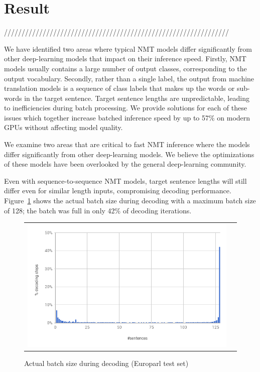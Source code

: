\documentclass[11pt,a4paper]{article}
\begin{document}
\section{Result}
\label{sec:Result}


////////////////////////////////////////////////////////////////


We have identified two areas where typical NMT models differ significantly from other deep-learning models that impact on their inference speed. Firstly, NMT models usually contains a large number of output classes, corresponding to the output vocabulary. Secondly, rather than a single label, the output from machine translation models is a sequence of class labels that makes up the words or sub-words in the target sentence. Target sentence lengths are unpredictable, leading to inefficiencies during batch processing. We provide solutions for each of these issues which together increase batched inference speed by up to 57\% on modern GPUs without affecting model quality.

We examine two areas that are critical to fast NMT inference where the models differ significantly from other deep-learning models. We believe the optimizations of these models have been overlooked by the general deep-learning community.



Even with sequence-to-sequence NMT models, target sentence lengths will still differ even for similar length inputs, compromising decoding performance. Figure~\ref{fig:batch-size} shows the actual batch size during decoding with a maximum batch size of 128; the batch was full in only 42\% of decoding iterations.

\begin{figure}
\centering
\begin{tabular}{cc}
{\includegraphics[scale=0.3]{batch-size.png}} 
\end{tabular}
\caption{Actual batch size during decoding (Europarl test set)}
\label{fig:batch-size}
\end{figure} 
\end{document}
